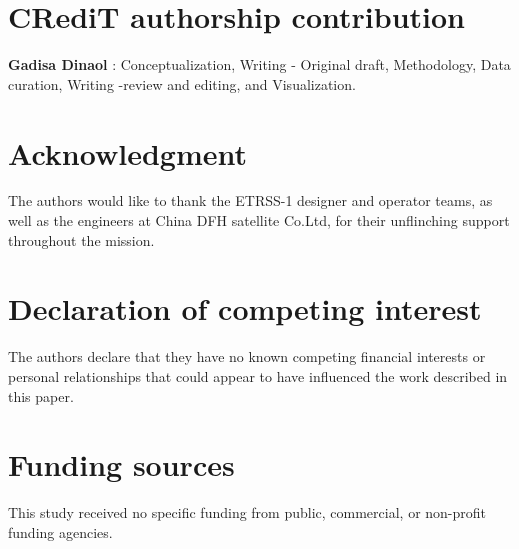 \documentclass[final,5p,times,twocolumn]{elsarticle}
\begin{document}
\section*{CRediT authorship contribution }
\textbf{Gadisa Dinaol }: Conceptualization,  Writing - Original draft, Methodology, Data curation, Writing -review and editing, and Visualization.
\section*{Acknowledgment}
The authors would like to thank the ETRSS-1 designer and operator teams, as well as the engineers at China DFH satellite Co.Ltd, for their unflinching support throughout the mission.
\section*{Declaration of competing interest}
The authors declare that they have no known competing financial interests or personal relationships that could appear to have influenced the work described in this paper.
\section*{Funding sources}
This study received no specific funding from public, commercial, or non-profit funding agencies.
 






\end{document}

